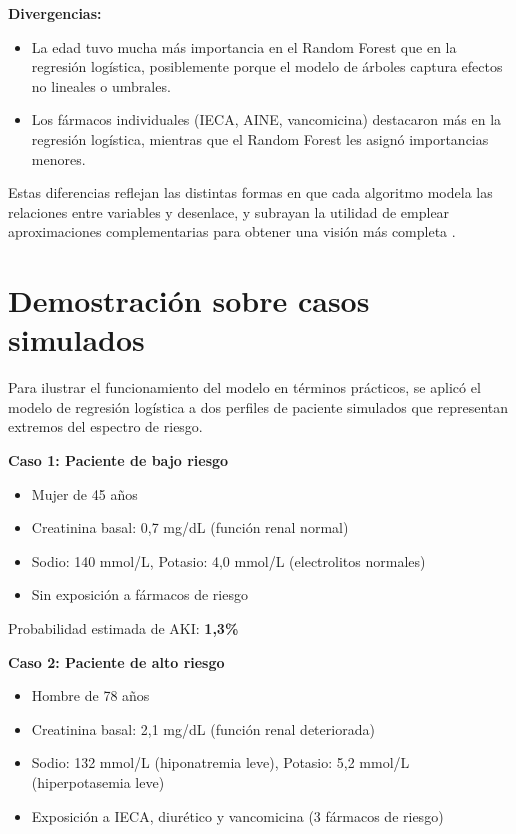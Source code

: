 \documentclass[12pt, a4paper, oneside]{report}
\begin{document}
\textbf{Divergencias:}
\begin{itemize}
    \item La edad tuvo mucha más importancia en el Random Forest que en la regresión logística, posiblemente porque el modelo de árboles captura efectos no lineales o umbrales.
    \item Los fármacos individuales (IECA, AINE, vancomicina) destacaron más en la regresión logística, mientras que el Random Forest les asignó importancias menores.
\end{itemize}

Estas diferencias reflejan las distintas formas en que cada algoritmo modela las relaciones entre variables y desenlace, y subrayan la utilidad de emplear aproximaciones complementarias para obtener una visión más completa \cite{steyerberg2014clinical}.

\section{Demostración sobre casos simulados}

Para ilustrar el funcionamiento del modelo en términos prácticos, se aplicó el modelo de regresión logística a dos perfiles de paciente simulados que representan extremos del espectro de riesgo.

\textbf{Caso 1: Paciente de bajo riesgo}
\begin{itemize}
    \item Mujer de 45 años
    \item Creatinina basal: 0,7 mg/dL (función renal normal)
    \item Sodio: 140 mmol/L, Potasio: 4,0 mmol/L (electrolitos normales)
    \item Sin exposición a fármacos de riesgo
\end{itemize}

Probabilidad estimada de AKI: \textbf{1,3\%}

\textbf{Caso 2: Paciente de alto riesgo}
\begin{itemize}
    \item Hombre de 78 años
    \item Creatinina basal: 2,1 mg/dL (función renal deteriorada)
    \item Sodio: 132 mmol/L (hiponatremia leve), Potasio: 5,2 mmol/L (hiperpotasemia leve)
    \item Exposición a IECA, diurético y vancomicina (3 fármacos de riesgo)
\end{itemize}
\end{document}
